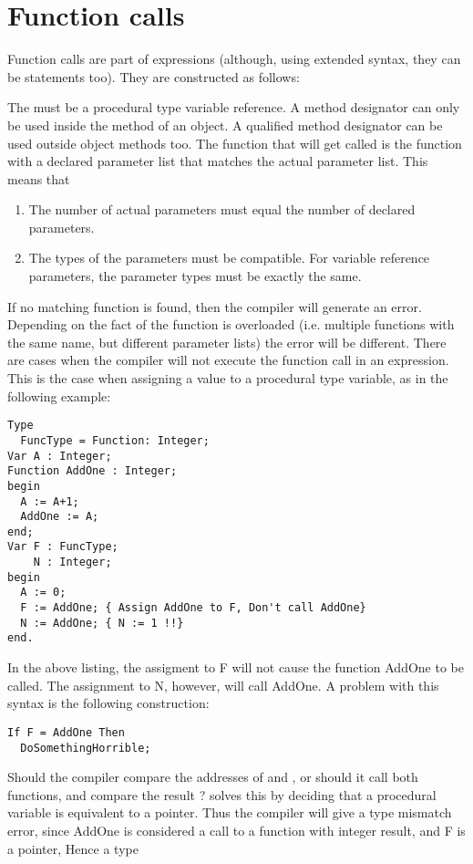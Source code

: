 \section{Function calls}
Function calls are part of expressions (although, using extended syntax,
they can be statements too). They are constructed as follows:

The  must be a procedural type variable reference.
A method designator can only be used inside the method of an object. A
qualified method designator can be used outside object methods too.
The function that will get called is the function with a declared parameter
list that matches the actual parameter list. This means that
\begin{enumerate}
\item The number of actual parameters must equal the number of declared
parameters.
\item The types of the parameters must be compatible. For variable
reference parameters, the parameter types must be exactly the same.
\end{enumerate}
If no matching function is found, then the compiler will generate an error.
Depending on the fact of the function is overloaded (i.e. multiple functions
with the same name, but different parameter lists) the error will be
different.
There are cases when the compiler will not execute the function call in an
expression. This is the case when assigning a value to a procedural
type variable, as in the following example:
\begin{verbatim}
Type
  FuncType = Function: Integer;
Var A : Integer;
Function AddOne : Integer;
begin
  A := A+1;
  AddOne := A;
end;
Var F : FuncType;
    N : Integer;
begin
  A := 0;
  F := AddOne; { Assign AddOne to F, Don't call AddOne}
  N := AddOne; { N := 1 !!}
end.
\end{verbatim}
In the above listing, the assigment to F will not cause the function AddOne
to be called. The assignment to N, however, will call AddOne.
A problem with this syntax is the following construction:
\begin{verbatim}
If F = AddOne Then
  DoSomethingHorrible;
\end{verbatim}
Should the compiler compare the addresses of  and ,
or should it call both functions, and compare the result ? \fpc solves this
by deciding that a procedural variable is equivalent to a pointer. Thus the
compiler will give a type mismatch error, since AddOne is considered a
call to a function with integer result, and F is a pointer, Hence a type
